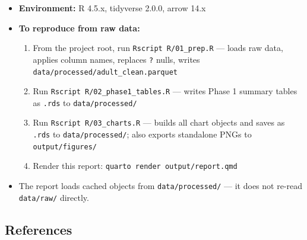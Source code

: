 \documentclass[
  letterpaper,
  DIV=11,
  numbers=noendperiod]{scrartcl}
\providecommand{\tightlist}{%
  \setlength{\itemsep}{0pt}\setlength{\parskip}{0pt}}\usepackage{longtable,booktabs,array}
\begin{document}
\begin{itemize}
\tightlist
\item
  \textbf{Environment:} R 4.5.x, tidyverse 2.0.0, arrow 14.x
\item
  \textbf{To reproduce from raw data:}

  \begin{enumerate}
  \def\labelenumi{\arabic{enumi}.}
  \tightlist
  \item
    From the project root, run \texttt{Rscript\ R/01\_prep.R} --- loads
    raw data, applies column names, replaces \texttt{?} nulls, writes
    \texttt{data/processed/adult\_clean.parquet}
  \item
    Run \texttt{Rscript\ R/02\_phase1\_tables.R} --- writes Phase 1
    summary tables as \texttt{.rds} to \texttt{data/processed/}
  \item
    Run \texttt{Rscript\ R/03\_charts.R} --- builds all chart objects
    and saves as \texttt{.rds} to \texttt{data/processed/}; also exports
    standalone PNGs to \texttt{output/figures/}
  \item
    Render this report: \texttt{quarto\ render\ output/report.qmd}
  \end{enumerate}
\item
  The report loads cached objects from \texttt{data/processed/} --- it
  does not re-read \texttt{data/raw/} directly.
\end{itemize}

\subsection{References}\label{references}
\end{document}
